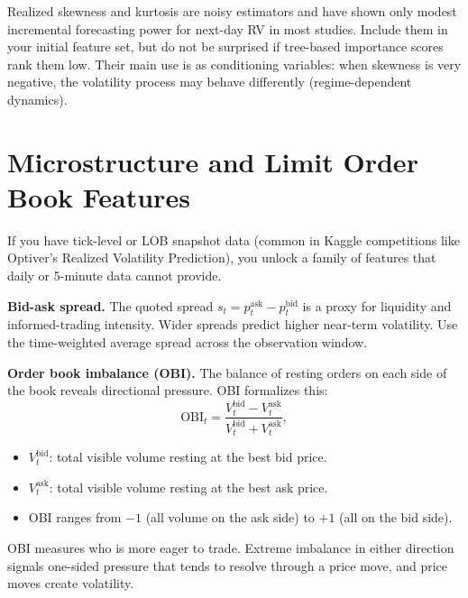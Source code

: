 \begin{warning}
Realized skewness and kurtosis are noisy estimators and have shown only modest incremental forecasting power for next-day RV in most studies.
Include them in your initial feature set, but do not be surprised if tree-based importance scores rank them low.
Their main use is as conditioning variables: when skewness is very negative, the volatility process may behave differently (regime-dependent dynamics).
\end{warning}

\section{Microstructure and Limit Order Book Features}\label{sec:feat-micro}

If you have tick-level or LOB snapshot data (common in Kaggle competitions like Optiver's Realized Volatility Prediction), you unlock a family of features that daily or 5-minute data cannot provide.

\textbf{Bid-ask spread.}
The quoted spread $s_t = p_t^{\text{ask}} - p_t^{\text{bid}}$ is a proxy for liquidity and informed-trading intensity.
Wider spreads predict higher near-term volatility.
Use the time-weighted average spread across the observation window.

\textbf{Order book imbalance (OBI).}
The balance of resting orders on each side of the book reveals directional pressure. OBI formalizes this:
\begin{equation}\label{eq:obi}
\text{OBI}_t = \frac{V_t^{\text{bid}} - V_t^{\text{ask}}}{V_t^{\text{bid}} + V_t^{\text{ask}}},
\end{equation}
\begin{itemize}[nosep]
  \item $V_t^{\text{bid}}$: total visible volume resting at the best bid price.
  \item $V_t^{\text{ask}}$: total visible volume resting at the best ask price.
  \item OBI ranges from $-1$ (all volume on the ask side) to $+1$ (all on the bid side).
\end{itemize}

\begin{intuition}
OBI measures who is more eager to trade. Extreme imbalance in either direction signals one-sided pressure that tends to resolve through a price move, and price moves create volatility.
\end{intuition}

